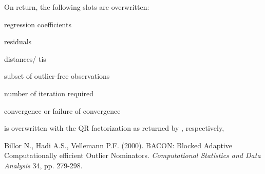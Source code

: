 \documentclass[a4paper,oneside,10pt,DIV=12]{scrartcl}
\begin{document}
\begin{Value}
On return, the following slots are overwritten:
	\begin{ldescription}
		\item[\code{beta}] regression coefficients
		\item[\code{resid}] residuals
		\item[\code{dist}] distances/ tis
		\item[\code{subset0}] subset of outlier-free observations
		\item[\code{maxiter}] number of iteration required
		\item[\code{success}] convergence or failure of convergence
		\item[\code{x}] is overwritten with the QR factorization as returned
			by , respectively, 
	\end{ldescription}
\end{Value}
\begin{References}
Billor N., Hadi A.S., Vellemann P.F. (2000). BACON: Blocked Adaptive
Computationally efficient Outlier Nominators. \textit{Computational Statistics
and Data Analysis} 34, pp. 279-298.
\end{References}
\end{document}
